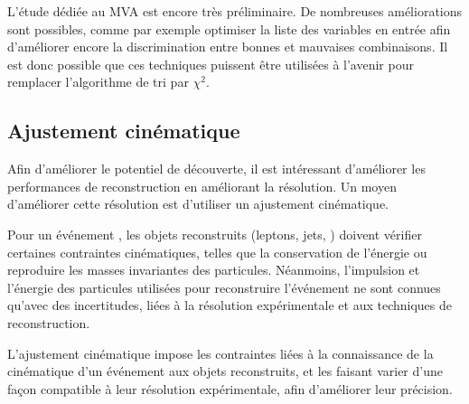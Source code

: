 \bigskip

L'étude dédiée au MVA est encore très préliminaire. De nombreuses améliorations sont possibles, comme par exemple optimiser la liste des variables en entrée afin d'améliorer encore la discrimination entre bonnes et mauvaises combinaisons. Il est donc possible que ces techniques puissent être utilisées à l'avenir pour remplacer l'algorithme de tri par $\chi^2$.

\subsection{Ajustement cinématique} \label{sec:mtt_kf}

Afin d'améliorer le potentiel de découverte, il est intéressant d'améliorer les performances de reconstruction en améliorant la résolution. Un moyen d'améliorer cette résolution est d'utiliser un ajustement cinématique.

\bigskip

Pour un événement \ttbar, les objets reconstruits (leptons, jets, \met) doivent vérifier certaines contraintes cinématiques, telles que la conservation de l'énergie ou reproduire les masses invariantes des particules. Néanmoins, l'impulsion et l'énergie des particules utilisées pour reconstruire l'événement \ttbar ne sont connues qu'avec des incertitudes, liées à la résolution expérimentale et aux techniques de reconstruction.

\medskip

L'ajustement cinématique impose les contraintes liées à la connaissance de la cinématique d'un événement \ttbar aux objets reconstruits, et les faisant varier d'une façon compatible à leur résolution expérimentale, afin d'améliorer leur précision.

